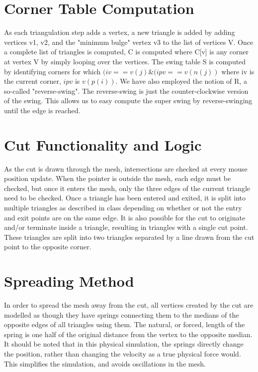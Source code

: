 \documentclass[letterpaper,10pt]{IEEEtran}
\begin{document}
\section{Corner Table \cite{Rossignac04compressingvolumes} Computation}
As each triangulation step adds a vertex, a new triangle is added by adding vertices v1, v2, and the "minimum bulge" vertex v3 to the list of vertices V.  Once a complete list of triangles is computed, C is computed where C[v] is any corner at vertex V by simply looping over the vertices.  The swing table S is computed by identifying corners for which $(iv == v(j) \& (ipv == v(n(j))$ where iv is the current corner, $ipv$ is $v(p(i))$.   We have also employed the notion of R, a so-called "reverse-swing".  The reverse-swing is just the counter-clockwise version of the swing.  This allows us to easy compute the super swing by reverse-swinging until the edge is reached.  
\section{Cut Functionality and Logic}
As the cut is drawn through the mesh, intersections are checked at every mouse position update.
When the pointer is outside the mesh, each edge must be checked, but once it enters the mesh, only the three edges of the current triangle need to be checked.
Once a triangle has been entered and exited, it is split into multiple triangles as described in class depending on whether or not the entry and exit points are on the same edge.
It is also possible for the cut to originate and/or terminate inside a triangle, resulting in triangles with a single cut point.
These triangles are split into two triangles separated by a line drawn from the cut point to the opposite corner.

\section{Spreading Method}
In order to spread the mesh away from the cut, all vertices created by the cut are modelled as though they have springs connecting them to the medians of the opposite edges of all triangles using them.
The natural, or forced, length of the spring is one half of the original distance from the vertex to the opposite median.
It should be noted that in this physical simulation, the springs directly change the position, rather than changing the velocity as a true physical force would.
This simplifies the simulation, and avoids oscillations in the mesh.
\end{document}
